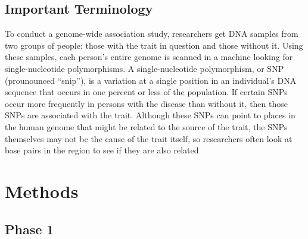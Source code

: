 \documentclass{article}
\begin{document}
\subsection*{Important Terminology}
To conduct a genome-wide association study, researchers get DNA samples from two
groups of people: those with the trait in question and those without it. Using 
these samples, each person's entire genome is scanned in a machine looking for 
single-nucleotide polymorphisms. A single-nucleotide polymorphism, or SNP 
(prounounced ``snip''), is a variation at a single position in an individual's 
DNA sequence that occurs in one percent or less of the population. If certain 
SNPs occur more frequently in persons with the disease than without it, then 
those SNPs are associated with the trait. Although these SNPs can point to places 
in the human genome that might be related to the source of the trait, the SNPs 
themselves may not be the cause of the trait itself, so researchers often look 
at base pairs in the region to see if they are also related
\section*{Methods}
\subsection{Phase 1}





\end{document}
